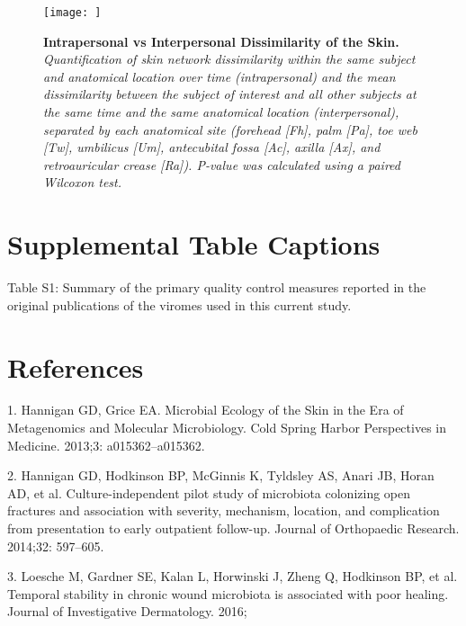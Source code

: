 \documentclass[12pt,]{article}
\begin{document}
\newpage

\begin{figure}[htbp]
\centering
\texttt{[image: ]}
\caption{\textbf{Intrapersonal vs Interpersonal Dissimilarity of the
Skin.} \emph{Quantification of skin network dissimilarity within the
same subject and anatomical location over time (intrapersonal) and the
mean dissimilarity between the subject of interest and all other
subjects at the same time and the same anatomical location
(interpersonal), separated by each anatomical site (forehead {[}Fh{]},
palm {[}Pa{]}, toe web {[}Tw{]}, umbilicus {[}Um{]}, antecubital fossa
{[}Ac{]}, axilla {[}Ax{]}, and retroauricular crease {[}Ra{]}). P-value
was calculated using a paired Wilcoxon test.}\label{allskin}}
\end{figure}

\newpage

\section{Supplemental Table Captions}\label{supplemental-table-captions}

Table S1: Summary of the primary quality control measures reported in
the original publications of the viromes used in this current study.

\newpage

\section*{References}\label{references}

\hypertarget{refs}{}
\hypertarget{ref-Hannigan:2013im}{}
1. Hannigan GD, Grice EA. Microbial Ecology of the Skin in the Era of
Metagenomics and Molecular Microbiology. Cold Spring Harbor Perspectives
in Medicine. 2013;3: a015362--a015362.

\hypertarget{ref-Hannigan:2014be}{}
2. Hannigan GD, Hodkinson BP, McGinnis K, Tyldsley AS, Anari JB, Horan
AD, et al. Culture-independent pilot study of microbiota colonizing open
fractures and association with severity, mechanism, location, and
complication from presentation to early outpatient follow-up. Journal of
Orthopaedic Research. 2014;32: 597--605.

\hypertarget{ref-Loesche:2016ev}{}
3. Loesche M, Gardner SE, Kalan L, Horwinski J, Zheng Q, Hodkinson BP,
et al. Temporal stability in chronic wound microbiota is associated with
poor healing. Journal of Investigative Dermatology. 2016;
\end{document}
